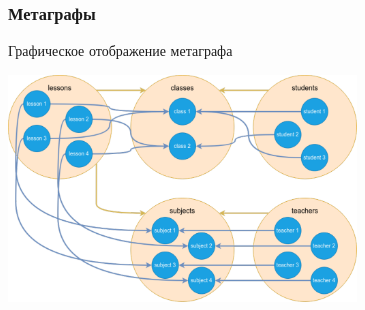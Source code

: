 \documentclass[pdf, hyperref={unicode}, aspectratio=169]{beamer}
\begin{document}
\begin{frame}
\frametitle{Метаграфы}
	Графическое отображение метаграфа

	\begin{center}
		\includegraphics[height = 6cm]{img/drawio-metagraph}
	\end{center}
\end{frame}
\end{document}
